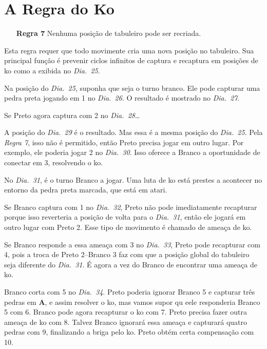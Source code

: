 \chapter{A Regra do Ko}

\begin{itemize}
  \item[\textbf{Regra 7}] Nenhuma posição de tabuleiro pode ser recriada.
\end{itemize}

Esta regra requer que todo movimente cria uma nova posição no tabuleiro. Sua principal função é prevenir ciclos infinitos de captura e recaptura em posições de ko como a exibida no \emph{Dia.\@~25}.


Na posição do \emph{Dia.\@~25}, suponha que seja o turno branco. Ele pode capturar uma pedra preta jogando em 1 no \emph{Dia.\@~26}. O resultado é mostrado no \emph{Dia.\@~27}.

Se Preto agora captura com 2 no \emph{Dia.\@~28}\ldots

A posição do \emph{Dia.\@~29} é o resultado. Mas essa é a mesma posição do \emph{Dia.\@~25}. Pela \emph{Regra 7}, isso não é permitido, então Preto precisa jogar em outro lugar. Por exemplo, ele poderia jogar 2 no \emph{Dia.\@~30}. Isso oferece a Branco a oportunidade de conectar em 3, resolvendo o ko.

No \emph{Dia.\@~31}, é o turno Branco a jogar. Uma luta de ko está prestes a acontecer no entorno da pedra preta marcada, que está em atari.

Se Branco captura com 1 no \emph{Dia.\@~32}, Preto não pode imediatamente recapturar porque isso reverteria a posição de volta para o \emph{Dia.\@~31}, então ele jogará em outro lugar com Preto 2. Esse tipo de movimento é chamado de ameaça de ko.

Se Branco responde a essa ameaça com 3 no \emph{Dia.\@~33}, Preto pode recapturar com 4, pois a troca de Preto 2--Branco 3 faz com que a posição global do tabuleiro seja diferente do \emph{Dia.\@~31}. É agora a vez do Branco de encontrar uma ameaça de ko.

Branco corta com 5 no \emph{Dia.\@~34}. Preto poderia ignorar Branco 5 e capturar três pedras em \textbf{A}, e assim  resolver o ko, mas vamos supor qu eele responderia Branco 5 com 6. Branco pode agora recapturar o ko com 7. Preto precisa fazer outra ameaça de ko com 8. Talvez Branco ignorará essa ameaça e capturará quatro pedras com 9, finalizando a briga pelo ko. Preto obtém certa compensação com 10.